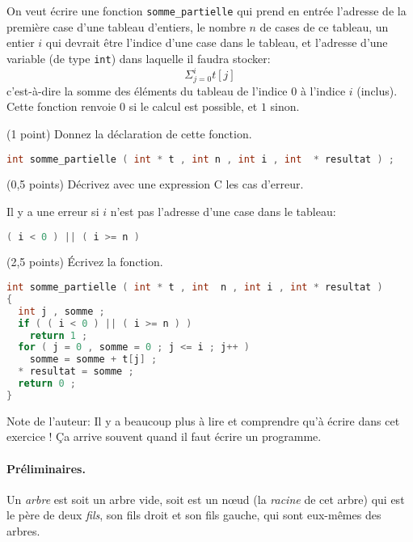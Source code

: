 On veut écrire une fonction \texttt{somme\_partielle} qui prend en
entrée l'adresse de la première case d'une tableau d'entiers, le
nombre \(n\) de cases de ce tableau, un entier \(i\) qui devrait être
l'indice d'une case dans le tableau, et l'adresse d'une variable (de
type \texttt{int}) dans laquelle il faudra stocker:
\[
\Sigma_{j=0}^i t[j]
\]
c'est-à-dire la somme des éléments du tableau de l'indice 0 à l'indice
\(i\) (inclus). Cette fonction renvoie \(0\) si le calcul est
possible, et \(1\) sinon.

\question (1 point) Donnez la déclaration de cette fonction.
\begin{solution}
  \begin{lstlisting}[language=C]
    int somme_partielle ( int * t , int n , int i , int  * resultat ) ;
  \end{lstlisting}
\end{solution}

\question (0,5 points) Décrivez avec une expression C les cas
d'erreur.
\begin{solution}
  Il y a une erreur si \(i\) n'est pas l'adresse d'une case dans le tableau:
  \begin{lstlisting}[language=C]
    ( i < 0 ) || ( i >= n )
  \end{lstlisting}
\end{solution}

\question (2,5 points) Écrivez la fonction.

\begin{solution}
  \begin{lstlisting}[language=C]
int somme_partielle ( int * t , int  n , int i , int * resultat )
{
  int j , somme ;
  if ( ( i < 0 ) || ( i >= n ) )
    return 1 ;
  for ( j = 0 , somme = 0 ; j <= i ; j++ )
    somme = somme + t[j] ;
  * resultat = somme ;
  return 0 ;
}
  \end{lstlisting}
\end{solution}


\begin{solution}
  Note de l'auteur: Il y a beaucoup plus à lire et comprendre qu'à
  écrire dans cet exercice ! \c Ca arrive souvent quand il faut écrire
  un programme.
\end{solution}

\paragraph{Pr{\'e}liminaires.}
Un \emph{arbre} est soit un arbre vide, soit est un n\oe{}ud (la
\emph{racine} de cet arbre) qui est le p{\`e}re de deux \emph{fils}, son
fils droit et son fils gauche, qui sont eux-m{\^e}mes des arbres.

